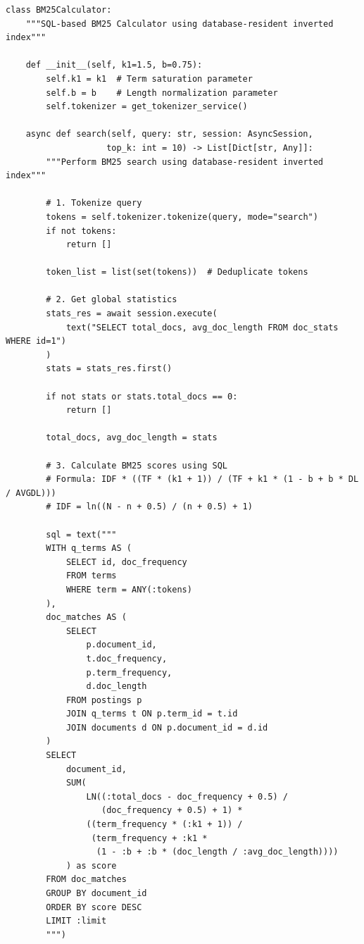 \begin{lstlisting}
class BM25Calculator:
    """SQL-based BM25 Calculator using database-resident inverted index"""
    
    def __init__(self, k1=1.5, b=0.75):
        self.k1 = k1  # Term saturation parameter
        self.b = b    # Length normalization parameter
        self.tokenizer = get_tokenizer_service()

    async def search(self, query: str, session: AsyncSession, 
                    top_k: int = 10) -> List[Dict[str, Any]]:
        """Perform BM25 search using database-resident inverted index"""
        
        # 1. Tokenize query
        tokens = self.tokenizer.tokenize(query, mode="search")
        if not tokens:
            return []
        
        token_list = list(set(tokens))  # Deduplicate tokens
        
        # 2. Get global statistics
        stats_res = await session.execute(
            text("SELECT total_docs, avg_doc_length FROM doc_stats WHERE id=1")
        )
        stats = stats_res.first()
        
        if not stats or stats.total_docs == 0:
            return []
        
        total_docs, avg_doc_length = stats
        
        # 3. Calculate BM25 scores using SQL
        # Formula: IDF * ((TF * (k1 + 1)) / (TF + k1 * (1 - b + b * DL / AVGDL)))
        # IDF = ln((N - n + 0.5) / (n + 0.5) + 1)
        
        sql = text("""
        WITH q_terms AS (
            SELECT id, doc_frequency 
            FROM terms 
            WHERE term = ANY(:tokens)
        ),
        doc_matches AS (
            SELECT 
                p.document_id,
                t.doc_frequency,
                p.term_frequency,
                d.doc_length
            FROM postings p
            JOIN q_terms t ON p.term_id = t.id
            JOIN documents d ON p.document_id = d.id
        )
        SELECT 
            document_id,
            SUM(
                LN((:total_docs - doc_frequency + 0.5) / 
                   (doc_frequency + 0.5) + 1) *
                ((term_frequency * (:k1 + 1)) / 
                 (term_frequency + :k1 * 
                  (1 - :b + :b * (doc_length / :avg_doc_length))))
            ) as score
        FROM doc_matches
        GROUP BY document_id
        ORDER BY score DESC
        LIMIT :limit
        """)
        

\end{lstlisting}
